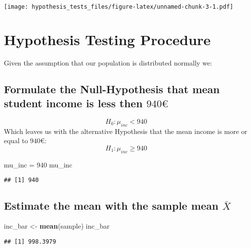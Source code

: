 \documentclass[]{article}
\newcommand{\euro}{€}
\newenvironment{Shaded}{\begin{snugshade}}{\end{snugshade}}
\newcommand{\KeywordTok}[1]{\textcolor[rgb]{0.13,0.29,0.53}{\textbf{#1}}}
\newcommand{\DecValTok}[1]{\textcolor[rgb]{0.00,0.00,0.81}{#1}}
\newcommand{\StringTok}[1]{\textcolor[rgb]{0.31,0.60,0.02}{#1}}
\newcommand{\NormalTok}[1]{#1}
\begin{document}
\texttt{[image: hypothesis\_tests\_files/figure-latex/unnamed-chunk-3-1.pdf]}

\section{Hypothesis Testing
Procedure}\label{hypothesis-testing-procedure}

Given the assumption that our population is distributed normally we:

\subsection{\texorpdfstring{Formulate the Null-Hypothesis that mean
student income is less then
\(940 €\)}{Formulate the Null-Hypothesis that mean student income is less then 940 \euro{}}}\label{formulate-the-null-hypothesis-that-mean-student-income-is-less-then-940}

\[ H_0 : \mu_{inc} < 940  \] Which leaves us with the alternative
Hypothesis that the mean income is more or equal to \(940€\):
\[ H_1: \mu_{inc} \geq 940 \]

\begin{Shaded}
\begin{Highlighting}[]
\NormalTok{mu_inc =}\StringTok{ }\DecValTok{940}
\NormalTok{mu_inc}
\end{Highlighting}
\end{Shaded}

\begin{verbatim}
## [1] 940
\end{verbatim}

\subsection{\texorpdfstring{Estimate the mean with the sample mean
\(\bar{X}\)}{Estimate the mean with the sample mean \textbackslash{}bar\{X\}}}\label{estimate-the-mean-with-the-sample-mean-barx}

\begin{Shaded}
\begin{Highlighting}[]
\NormalTok{inc_bar <-}\StringTok{ }\KeywordTok{mean}\NormalTok{(sample)}
\NormalTok{inc_bar}
\end{Highlighting}
\end{Shaded}

\begin{verbatim}
## [1] 998.3979
\end{verbatim}
\end{document}
